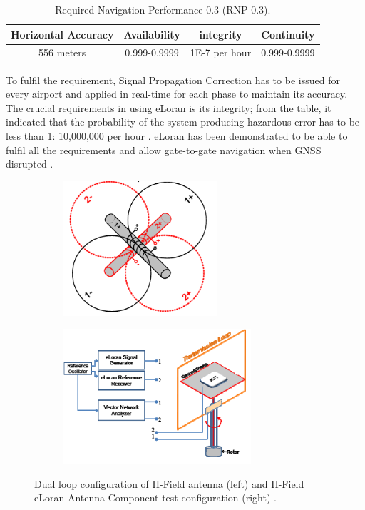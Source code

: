 \begin{table}[h!]
\centering
\caption{Required Navigation Performance 0.3 (RNP 0.3).}
\begin{tabular}{||c c c c||} 
 \hline
Horizontal Accuracy & Availability & integrity & Continuity \\ [0.5ex] 
 \hline\hline
556 meters & 0.999-0.9999 & 1E-7 per hour & 0.999-0.9999 \\ [1ex]
 \hline
\end{tabular}
\label{table:1}
\end{table}

\noindent To fulfil the requirement, Signal Propagation Correction has to be issued for every airport and applied in real-time for each phase to maintain its accuracy. The crucial requirements in using eLoran is its integrity; from the table, it indicated that the probability of the system producing hazardous error has to be less than 1: 10,000,000 per hour \cite{InternationalLORANAssociation2007EnhancedApril}. eLoran has been demonstrated to be able to fulfil all the requirements and allow gate-to-gate navigation when GNSS disrupted \cite{InternationalLORANAssociation2007EnhancedApril}\cite{Narins2014TheBoard}.\\

\vspace{3mm}
\begin{figure}[!ht]
\begin{center}
%    
  \begin{subfigure}[b]{0.45\textwidth}
    \includegraphics[height=5cm]{Figures/ELORAN_hfield_conf.PNG}
  \end{subfigure}
  \begin{subfigure}[b]{0.5\textwidth}
    \includegraphics[height=5cm]{Figures/ELORAN_hfield__antenna_component.PNG}
  \end{subfigure}
%  
  \caption{Dual loop configuration of H-Field antenna (left) and H-Field eLoran Antenna Component test configuration (right) \cite{BartoneH-fieldApplications}.}
    \label{fig:hloop antenna}
\end{center}
\end{figure}
\vspace{3mm}


